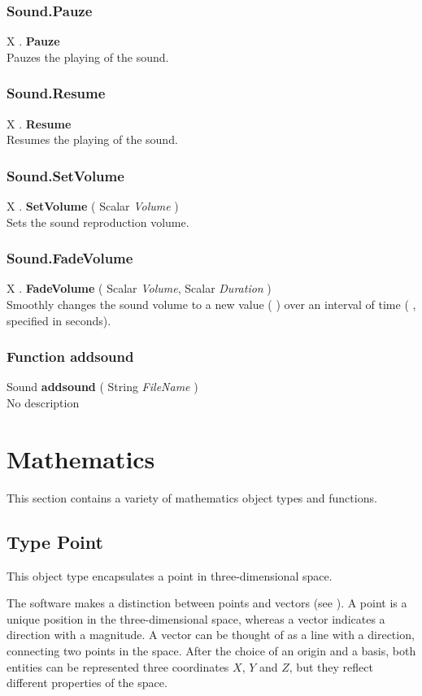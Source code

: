 \subsubsection{Sound.Pauze \label{F:Sound:Pauze}}
X . \textbf{Pauze} \\
Pauzes the playing of the sound.

\subsubsection{Sound.Resume \label{F:Sound:Resume}}
X . \textbf{Resume} \\
Resumes the playing of the sound.

\subsubsection{Sound.SetVolume \label{F:Sound:SetVolume}}
X . \textbf{SetVolume} ( Scalar \textit{Volume} ) \\
Sets the sound reproduction volume.

\subsubsection{Sound.FadeVolume \label{F:Sound:FadeVolume}}
X . \textbf{FadeVolume} ( Scalar \textit{Volume}, Scalar \textit{Duration} ) \\
Smoothly changes the sound volume to a new value (  ) over an interval of time (  , specified in seconds).

\subsubsection{Function addsound \label{F:addsound}}
Sound \textbf{addsound} ( String \textit{FileName} ) \\
No description

\section{Mathematics \label{Mathematics}}
This section contains a variety of mathematics object types and functions.

\subsection{Type Point \label{T:Point}}
This object type encapsulates a point in three-dimensional space.

The software makes a distinction between points and vectors (see ). A point is a unique position in the three-dimensional space, whereas a vector indicates a direction with a magnitude. A vector can be thought of as a line with a direction, connecting two points in the space. After the choice of an origin and a basis, both entities can be represented three coordinates $X$, $Y$ and $Z$, but they reflect different properties of the space.

